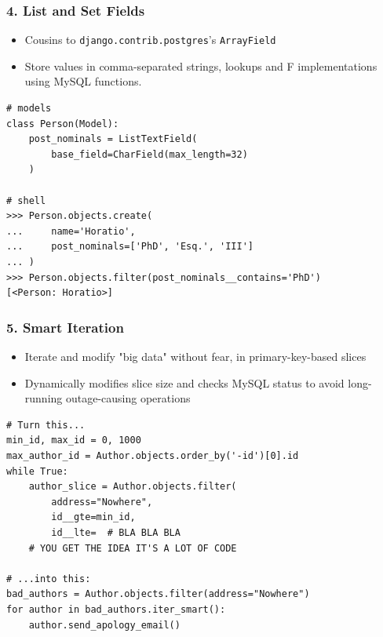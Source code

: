 \documentclass{beamer}
\begin{document}
\begin{frame}[fragile]\frametitle{4. List and Set Fields}

    \begin{itemize}
        \item Cousins to \texttt{django.contrib.postgres}'s \texttt{ArrayField}
        \item Store values in comma-separated strings, lookups and F
              implementations using MySQL functions.
    \end{itemize}


    \begin{lstlisting}
# models
class Person(Model):
    post_nominals = ListTextField(
        base_field=CharField(max_length=32)
    )

# shell
>>> Person.objects.create(
...     name='Horatio',
...     post_nominals=['PhD', 'Esq.', 'III']
... )
>>> Person.objects.filter(post_nominals__contains='PhD')
[<Person: Horatio>]
    \end{lstlisting}

\end{frame}


\begin{frame}[fragile]\frametitle{5. Smart Iteration}

    \begin{itemize}
        \item Iterate and modify "big data" without fear, in primary-key-based
              slices
        \item Dynamically modifies slice size and checks MySQL status to avoid
              long-running outage-causing operations
    \end{itemize}

    \begin{lstlisting}
# Turn this...
min_id, max_id = 0, 1000
max_author_id = Author.objects.order_by('-id')[0].id
while True:
    author_slice = Author.objects.filter(
        address="Nowhere",
        id__gte=min_id,
        id__lte=  # BLA BLA BLA
    # YOU GET THE IDEA IT'S A LOT OF CODE

# ...into this:
bad_authors = Author.objects.filter(address="Nowhere")
for author in bad_authors.iter_smart():
    author.send_apology_email()
    \end{lstlisting}

\end{frame}
\end{document}
